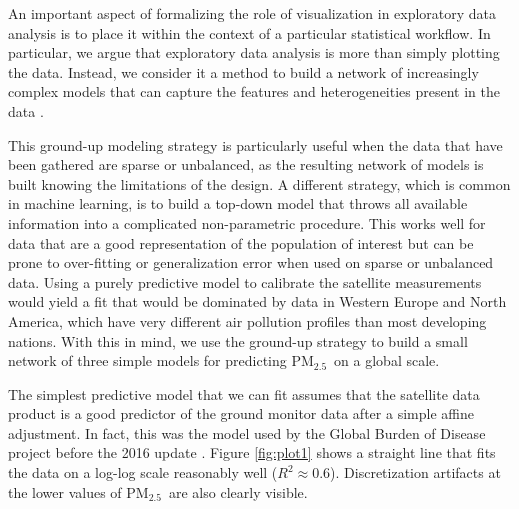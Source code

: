 \documentclass{statsoc}
\newcommand{\PM}{PM$_{2.5}$}
\begin{document}
An important aspect of formalizing the role of visualization in exploratory data
analysis is to place it within the context of a particular statistical workflow.
In particular, we argue that exploratory data analysis is more than simply
plotting the data. Instead, we consider it a method to build a network of
increasingly complex models that can capture the features and heterogeneities
present in the data   \citep{gelman2004exploratory}.

This ground-up modeling strategy is particularly useful when the data that have
been gathered are sparse or unbalanced, as the resulting network of models is
built knowing the limitations of the design. A different strategy, which is
common in machine learning, is to build a top-down model that throws all
available information into a complicated non-parametric procedure.  This works
well for data that are a good representation of the population of interest but
can be prone to over-fitting or generalization error when used on sparse or
unbalanced data.  Using a purely predictive model to calibrate the satellite
measurements would yield a fit that would be dominated by data in Western Europe
and North America, which have very different air pollution profiles than most
developing nations. With this in mind, we use the ground-up strategy to build a
small network of three simple models for predicting \PM\ on a global scale.

The simplest predictive model that we can fit assumes that the satellite data
product is a good predictor of the ground monitor data after a simple affine
adjustment. In fact, this was the model used by the Global Burden of Disease
project before the 2016 update \citep{forouzanfar2015global}. Figure
\ref{fig:plot1} shows a straight line that fits the data on a log-log scale
reasonably well ($R^2 \approx 0.6$). Discretization artifacts at the lower
values of \PM\ are also clearly visible.
\end{document}
